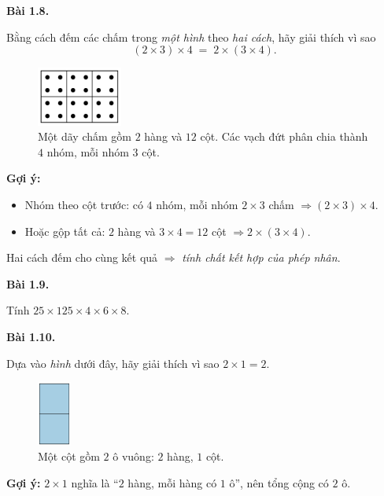 \documentclass[14pt,a4paper]{extbook}
\newenvironment{problem}[1][]{
  \par\noindent\textbf{Bài #1.}\ \ignorespaces
}{\par}
\begin{document}
\begin{problem}[1.8]
Bằng cách đếm các chấm trong \emph{một hình} theo \emph{hai cách}, hãy giải thích vì sao
\[
(2\times3)\times4 \;=\; 2\times(3\times4).
\]

\begin{figure}[ht!]
  \centering
  \includegraphics[width=0.25\textwidth]{img/fig-prob1.8.pdf}
  \caption*{\small Một dãy chấm gồm \(2\) hàng và \(12\) cột. Các vạch đứt
  phân chia thành \(4\) nhóm, mỗi nhóm \(3\) cột.}
\end{figure}

\textbf{Gợi ý:} 
\begin{itemize}
  \item Nhóm theo cột trước: có \(4\) nhóm, mỗi nhóm \(2\times3\) chấm
  \(\Rightarrow (2\times3)\times4\).
  \item Hoặc gộp tất cả: \(2\) hàng và \(3\times4=12\) cột
  \(\Rightarrow 2\times(3\times4)\).
\end{itemize}
Hai cách đếm cho cùng kết quả \(\Rightarrow\) \emph{tính chất kết hợp của phép nhân}.
\end{problem}

\begin{problem}[1.9]
Tính \(25\times125\times4\times6\times8\).
\end{problem}

\begin{problem}[1.10]
Dựa vào \emph{hình} dưới đây, hãy giải thích vì sao \(2\times1=2\).

\begin{figure}[ht!]
  \centering
  \includegraphics[width=0.10\textwidth]{img/fig-prob1.10.pdf}
  \caption*{\small Một cột gồm \(2\) ô vuông: \(2\) hàng, \(1\) cột.}
\end{figure}

\textbf{Gợi ý:} \(2\times1\) nghĩa là “\(2\) hàng, mỗi hàng có \(1\) ô”,
nên tổng cộng có \(2\) ô.
\end{problem}
\end{document}
